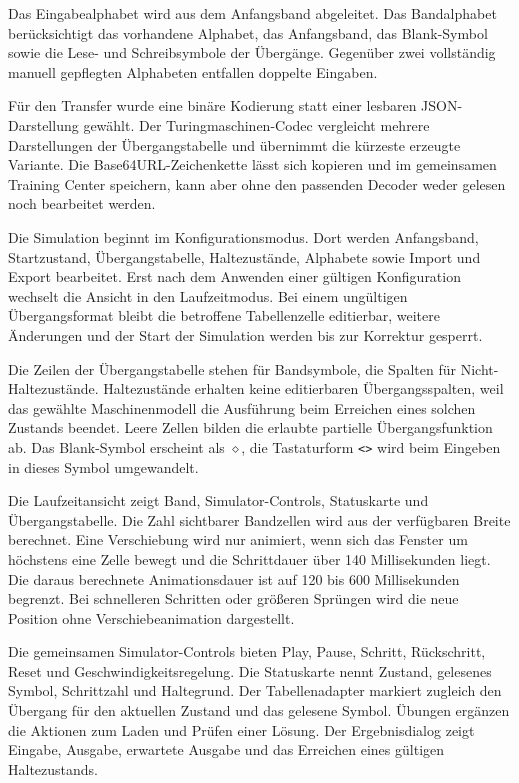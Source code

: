 Das Eingabealphabet wird aus dem Anfangsband abgeleitet. Das Bandalphabet berücksichtigt das vorhandene Alphabet, das Anfangsband, das Blank-Symbol sowie die Lese- und Schreibsymbole der Übergänge. Gegenüber zwei vollständig manuell gepflegten Alphabeten entfallen doppelte Eingaben.

Für den Transfer wurde eine binäre Kodierung statt einer lesbaren JSON-Darstellung gewählt. Der Turingmaschinen-Codec vergleicht mehrere Darstellungen der Übergangstabelle und übernimmt die kürzeste erzeugte Variante. Die Base64URL-Zeichenkette lässt sich kopieren und im gemeinsamen Training Center speichern, kann aber ohne den passenden Decoder weder gelesen noch bearbeitet werden.


Die Simulation beginnt im Konfigurationsmodus. Dort werden Anfangsband, Startzustand, Übergangstabelle, Haltezustände, Alphabete sowie Import und Export bearbeitet. Erst nach dem Anwenden einer gültigen Konfiguration wechselt die Ansicht in den Laufzeitmodus. Bei einem ungültigen Übergangsformat bleibt die betroffene Tabellenzelle editierbar, weitere Änderungen und der Start der Simulation werden bis zur Korrektur gesperrt.

Die Zeilen der Übergangstabelle stehen für Bandsymbole, die Spalten für Nicht-Haltezustände. Haltezustände erhalten keine editierbaren Übergangsspalten, weil das gewählte Maschinenmodell die Ausführung beim Erreichen eines solchen Zustands beendet. Leere Zellen bilden die erlaubte partielle Übergangsfunktion ab. Das Blank-Symbol erscheint als \(\diamond\), die Tastaturform \verb|<>| wird beim Eingeben in dieses Symbol umgewandelt.

Die Laufzeitansicht zeigt Band, Simulator-Controls, Statuskarte und Übergangstabelle. Die Zahl sichtbarer Bandzellen wird aus der verfügbaren Breite berechnet. Eine Verschiebung wird nur animiert, wenn sich das Fenster um höchstens eine Zelle bewegt und die Schrittdauer über 140 Millisekunden liegt. Die daraus berechnete Animationsdauer ist auf 120 bis 600 Millisekunden begrenzt. Bei schnelleren Schritten oder größeren Sprüngen wird die neue Position ohne Verschiebeanimation dargestellt.

Die gemeinsamen Simulator-Controls bieten Play, Pause, Schritt, Rückschritt, Reset und Geschwindigkeitsregelung. Die Statuskarte nennt Zustand, gelesenes Symbol, Schrittzahl und Haltegrund. Der Tabellenadapter markiert zugleich den Übergang für den aktuellen Zustand und das gelesene Symbol. Übungen ergänzen die Aktionen zum Laden und Prüfen einer Lösung. Der Ergebnisdialog zeigt Eingabe, Ausgabe, erwartete Ausgabe und das Erreichen eines gültigen Haltezustands.

